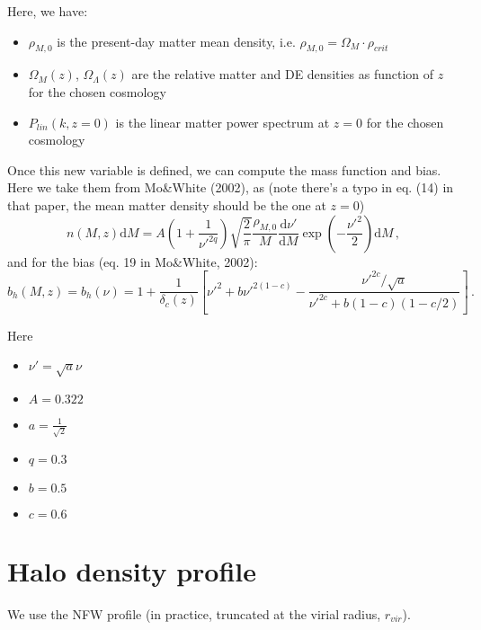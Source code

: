 \documentclass[10pt,a4paper]{article}
\begin{document}
Here, we have:
\begin{itemize}
\item $\rho_{M,0}$ is the present-day matter mean density, i.e. $\rho_{M,0} = \Omega_M \cdot \rho_{crit}$
\item $\Omega_M(z)$, $\Omega_{\Lambda}(z)$ are the relative matter and DE densities as function of $z$ for the chosen cosmology
\item $P_{lin}(k, z=0)$ is the linear matter power spectrum at $z=0$ for the chosen cosmology
\end{itemize}

Once this new variable is defined, we can compute the mass function and bias. Here we take them from Mo\&White (2002), as
(note there's a typo in eq. (14) in that paper, the mean matter density should be the one at $z=0$)
\begin{equation}
n(M,z)\mathrm{d}M = A \left(1 + \frac{1}{\nu'^{2q}}\right) \sqrt{\frac{2}{\pi}} \frac{\rho_{M,0}}{M} \frac{\mathrm{d}\nu'}{\mathrm{d}M} \exp\left(-\frac{\nu'^2}{2}\right)\mathrm{d}M \, ,
\end{equation}
and for the bias (eq. 19 in Mo\&White, 2002):
\begin{equation}
b_h(M,z) = b_h(\nu) = 1 + \frac{1}{\delta_c(z)}\left[ \nu'^2 + b\nu'^{2(1-c)} - \frac{\nu'^{2c}/\sqrt{a}}{\nu'^{2c} + b(1-c)(1 -c/2)}\right] \, .
\end{equation}

Here
\begin{itemize}
\item $\nu' = \sqrt{a}\nu$
\item $A = 0.322$
\item $a = \frac{1}{\sqrt{2}}$
\item $q = 0.3$
\item $b = 0.5$
\item $c = 0.6$
\end{itemize}


\section{Halo density profile}

We use the NFW profile (in practice, truncated at the virial radius, $r_{vir}$).
\end{document}

